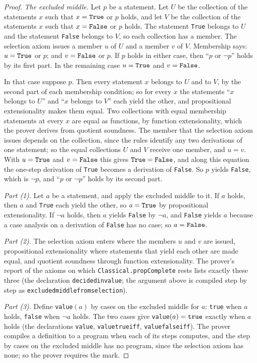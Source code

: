 \documentclass[11pt]{article}
\theoremstyle{definition}
\theoremstyle{remark}
\DeclareRobustCommand{\lean}[1]{{\renewcommand{\_}{\textunderscore\allowbreak}\texttt{#1}}}
\newcommand{\True}{\lean{True}}
\newcommand{\False}{\lean{False}}
\begin{document}
\begin{proof}
\emph{The excluded middle.} Let $p$ be a statement. Let $U$ be the collection of the statements $x$ such that $x=\True$ or $p$ holds, and let $V$ be the collection of the statements $x$ such that $x=\False$ or $p$ holds. The statement \True{} belongs to $U$ and the statement \False{} belongs to $V$, so each collection has a member. The selection axiom issues a member $u$ of $U$ and a member $v$ of $V$. Membership says: $u=\True$ or $p$; and $v=\False$ or $p$. If $p$ holds in either case, then ``$p$ or $\neg p$'' holds by its first part. In the remaining case $u=\True$ and $v=\False$.

In that case suppose $p$. Then every statement $x$ belongs to $U$ and to $V$, by the second part of each membership condition; so for every $x$ the statements ``$x$ belongs to $U$'' and ``$x$ belongs to $V$'' each yield the other, and propositional extensionality makes them equal. Two collections with equal membership statements at every $x$ are equal as functions, by function extensionality, which the prover derives from quotient soundness. The member that the selection axiom issues depends on the collection, since the rules identify any two derivations of one statement; so the equal collections $U$ and $V$ receive one member, and $u=v$. With $u=\True$ and $v=\False$ this gives $\True=\False$, and along this equation the one-step derivation of \True{} becomes a derivation of \False. So $p$ yields \False, which is $\neg p$, and ``$p$ or $\neg p$'' holds by its second part.

\emph{Part (1).} Let $a$ be a statement, and apply the excluded middle to it. If $a$ holds, then $a$ and \True{} each yield the other, so $a=\True$ by propositional extensionality. If $\neg a$ holds, then $a$ yields \False{} by $\neg a$, and \False{} yields $a$ because a case analysis on a derivation of \False{} has no case; so $a=\False$.

\emph{Part (2).} The selection axiom enters where the members $u$ and $v$ are issued, propositional extensionality where statements that yield each other are made equal, and quotient soundness through function extensionality. The prover's report of the axioms on which \lean{Classical.propComplete} rests lists exactly these three (the declaration \lean{decided\_in\_value}; the argument above is compiled step by step as \lean{excluded\_middle\_from\_selection}).

\emph{Part (3).} Define \lean{value}$(a)$ by cases on the excluded middle for $a$: \lean{true} when $a$ holds, \lean{false} when $\neg a$ holds. The two cases give \lean{value}$(a)=\lean{true}$ exactly when $a$ holds (the declarations \lean{value}, \lean{value\_true\_iff}, \lean{value\_false\_iff}). The prover compiles a definition to a program when each of its steps computes, and the step by cases on the excluded middle has no program, since the selection axiom has none; so the prover requires the mark.
\end{proof}
\end{document}
